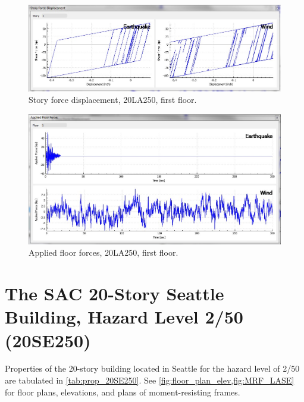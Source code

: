 \documentclass{simcenterdocumentation}
\begin{document}
\begin{figure}[H]
	\centering \includegraphics[scale=0.35]{20LA250_sfd.jpg}
	\caption{Story force displacement, 20LA250, first floor.}
\end{figure}
\begin{figure}[H]
	\centering \includegraphics[scale=0.35]{20LA250_aff.jpg}
	\caption{Applied floor forces, 20LA250, first floor.}
\end{figure}





\section{The SAC 20-Story Seattle Building, Hazard Level 2/50 (20SE250)}
Properties of the 20-story building located in Seattle for the hazard level of 2/50 are tabulated in \cref{tab:prop_20SE250}. See \cref{fig:floor_plan_elev,fig:MRF_LASE} for floor plans, elevations, and plans of moment-resisting frames.
\end{document}
